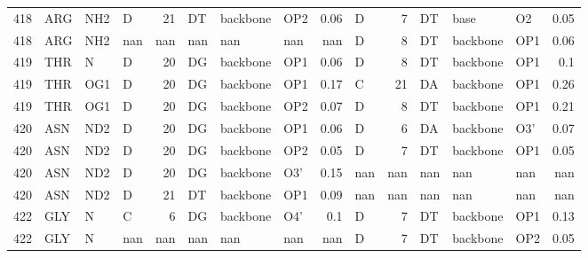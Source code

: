 \begin{longtable}{rlllrlllrlrlllr}
       418 & ARG        & NH2    & D         &          21 & DT           & backbone    & OP2      &          0.06 & D         &           7 & DT           & base        & O2       &          0.05 \\
       418 & ARG        & NH2    & nan       &         nan & nan          & nan         & nan      &        nan    & D         &           8 & DT           & backbone    & OP1      &          0.06 \\
       419 & THR        & N      & D         &          20 & DG           & backbone    & OP1      &          0.06 & D         &           8 & DT           & backbone    & OP1      &          0.1  \\
       419 & THR        & OG1    & D         &          20 & DG           & backbone    & OP1      &          0.17 & C         &          21 & DA           & backbone    & OP1      &          0.26 \\
       419 & THR        & OG1    & D         &          20 & DG           & backbone    & OP2      &          0.07 & D         &           8 & DT           & backbone    & OP1      &          0.21 \\
       420 & ASN        & ND2    & D         &          20 & DG           & backbone    & OP1      &          0.06 & D         &           6 & DA           & backbone    & O3'      &          0.07 \\
       420 & ASN        & ND2    & D         &          20 & DG           & backbone    & OP2      &          0.05 & D         &           7 & DT           & backbone    & OP1      &          0.05 \\
       420 & ASN        & ND2    & D         &          20 & DG           & backbone    & O3'      &          0.15 & nan       &         nan & nan          & nan         & nan      &        nan    \\
       420 & ASN        & ND2    & D         &          21 & DT           & backbone    & OP1      &          0.09 & nan       &         nan & nan          & nan         & nan      &        nan    \\
       422 & GLY        & N      & C         &           6 & DG           & backbone    & O4'      &          0.1  & D         &           7 & DT           & backbone    & OP1      &          0.13 \\
       422 & GLY        & N      & nan       &         nan & nan          & nan         & nan      &        nan    & D         &           7 & DT           & backbone    & OP2      &          0.05 \\

\end{longtable}
